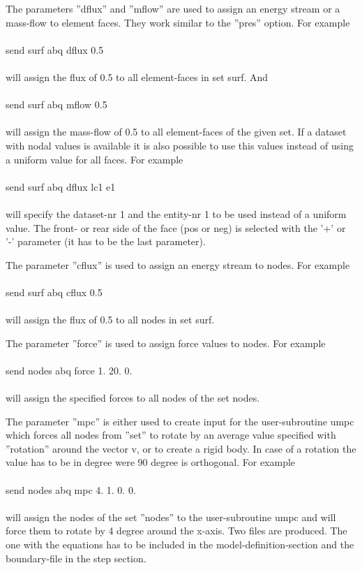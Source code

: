 \documentclass{article}
\begin{document}
The parameters ''dflux'' and ''mflow'' are used to assign an energy stream or a mass-flow to element faces. They work similar to the ''pres'' option. For example\\\\send surf abq dflux 0.5\\\\will assign the flux of 0.5 to all element-faces in set surf. And\\\\send surf abq mflow 0.5\\\\will assign the mass-flow of 0.5 to all element-faces of the given set. If a dataset with nodal values is available it is also possible to use this values instead of using a uniform value for all faces. For example\\\\send surf abq dflux lc1 e1\\\\will specify the dataset-nr 1 and the entity-nr 1 to be used instead of a uniform value. The front- or rear side of the face (pos or neg) is selected with the '+' or '-' parameter (it has to be the last parameter).

The parameter ''cflux'' is used to assign an energy stream to nodes. For example\\\\send surf abq cflux 0.5\\\\will assign the flux of 0.5 to all nodes in set surf.

The parameter ''force'' is used to assign force values to nodes. For example\\\\send nodes abq force 1. 20. 0.\\\\will assign the specified forces to all nodes of the set nodes.

The parameter ''mpc'' is either used to create input for the user-subroutine umpc which forces all nodes from ''set'' to rotate by an average value specified with ''rotation'' around the vector v, or to create a rigid body. In case of a rotation the value has to be in degree were 90 degree is orthogonal. For example\\\\send nodes abq mpc 4. 1. 0. 0.\\\\will assign the nodes of the set ''nodes'' to the user-subroutine umpc and will force them to rotate by 4 degree around the x-axis. Two files are produced. The one with the equations has to be included in the model-definition-section and the boundary-file in the step section.
\end{document}
